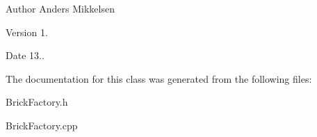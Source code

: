\begin{DoxyAuthor}{Author}
Anders Mikkelsen 
\end{DoxyAuthor}
\begin{DoxyVersion}{Version}
1. 
\end{DoxyVersion}
\begin{DoxyDate}{Date}
13.. 
\end{DoxyDate}


The documentation for this class was generated from the following files\+:\begin{DoxyCompactItemize}
\item 
Brick\+Factory.\+h\item 
Brick\+Factory.\+cpp\end{DoxyCompactItemize}
